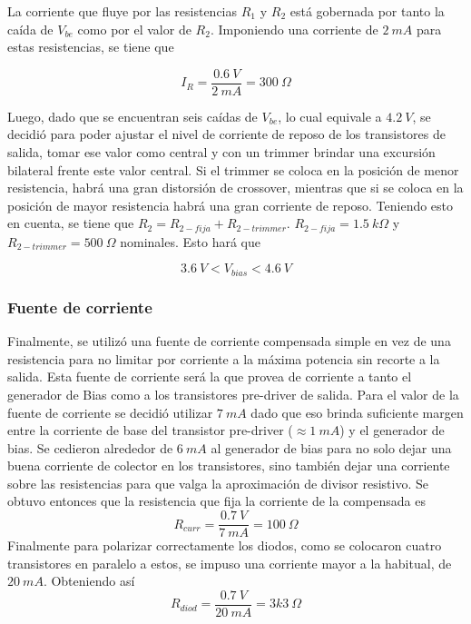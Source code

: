 La corriente que fluye por las resistencias $R_1$ y $R_2$ está gobernada por tanto la caída de $V_{be}$ como por el valor de $R_2$. Imponiendo una corriente de $2 \ mA$ para estas resistencias, se tiene que

\begin{equation}
I_R = \frac{0.6 \ V}{2 \ mA} = 300 \ \Omega
\end{equation}

Luego, dado que se encuentran seis caídas de $V_{be}$, lo cual equivale a $4.2 \ V$, se decidió para poder ajustar el nivel de corriente de reposo de los transistores de salida, tomar ese valor como central y con un trimmer brindar una excursión bilateral frente este valor central. Si el trimmer se coloca en la posición de menor resistencia, habrá una gran distorsión de crossover, mientras que si se coloca en la posición de mayor resistencia habrá una gran corriente de reposo. Teniendo esto en cuenta, se tiene que $R_2 = R_{2-fija} + R_{2-trimmer}$. $R_{2-fija} = 1.5 \ k\Omega$ y $R_{2-trimmer} = 500 \ \Omega$ nominales. Esto hará que

\begin{equation}
3.6 \ V < V_{bias} < 4.6 \ V
\end{equation} 

\subsubsection{Fuente de corriente}

Finalmente, se utilizó una fuente de corriente compensada simple en vez de una resistencia para no limitar por corriente a la máxima potencia sin recorte a la salida. Esta fuente de corriente será la que provea de corriente a tanto el generador de Bias como a los transistores pre-driver de salida. Para el valor de la fuente de corriente se decidió utilizar $7 \ mA$ dado que eso brinda suficiente margen entre la corriente de base del transistor pre-driver ($\approx 1 \ mA$) y el generador de bias. Se cedieron alrededor de $6 \ mA$ al generador de bias para no solo dejar una buena corriente de colector en los transistores, sino también dejar una corriente sobre las resistencias para que valga la aproximación de divisor resistivo. Se obtuvo entonces que la resistencia que fija la corriente de la compensada es
\begin{equation}
R_{curr} = \frac{0.7 \ V}{7 \ mA} = 100 \ \Omega
\end{equation}
Finalmente para polarizar correctamente los diodos, como se colocaron cuatro transistores en paralelo a estos, se impuso una corriente mayor a la habitual, de $20 \ mA$. Obteniendo así
\begin{equation}
R_{diod} = \frac{0.7 \ V}{20 \ mA} = 3k3 \ \Omega
\end{equation}

